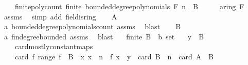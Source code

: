 \begin{isabellebody}
\ \ \ \ finite{\isacharunderscore}{\kern0pt}poly{\isacharunderscore}{\kern0pt}count{\isacharcolon}{\kern0pt}\ {\isachardoublequoteopen}finite\ {\isacharparenleft}{\kern0pt}bounded{\isacharunderscore}{\kern0pt}degree{\isacharunderscore}{\kern0pt}polynomials\ F\ n{\isacharparenright}{\kern0pt}{\isachardoublequoteclose}\ {\isacharparenleft}{\kern0pt}\ {\isacharquery}{\kern0pt}B{\isacharparenright}{\kern0pt}\isanewline
%
\isadelimproof
%
\endisadelimproof
%
\isatagproof
{}\isamarkupfalse%
\ {\isacharminus}{\kern0pt}\isanewline
\ \ \isamarkupfalse%
\ a{\isacharcolon}{\kern0pt}{\isachardoublequoteopen}ring\ F{\isachardoublequoteclose}\ \isamarkupfalse%
\ assms{\isacharparenleft}{\kern0pt}{}{\isacharparenright}{\kern0pt}\ \isamarkupfalse%
\ {\isacharparenleft}{\kern0pt}simp\ add{\isacharcolon}{\kern0pt}\ field{\isachardot}{\kern0pt}is{\isacharunderscore}{\kern0pt}ring{\isacharparenright}{\kern0pt}\isanewline
\ \ \isamarkupfalse%
\ {\isacharquery}{\kern0pt}A\ \isamarkupfalse%
\ a\ bounded{\isacharunderscore}{\kern0pt}degree{\isacharunderscore}{\kern0pt}polynomials{\isacharunderscore}{\kern0pt}count\ assms\ \isamarkupfalse%
\ blast\isanewline
\ \ \isamarkupfalse%
\ {\isacharquery}{\kern0pt}B\ \isamarkupfalse%
\ a\ fin{\isacharunderscore}{\kern0pt}degree{\isacharunderscore}{\kern0pt}bounded\ assms\ \isamarkupfalse%
\ blast\isanewline
{}\isamarkupfalse%
%
\endisatagproof
{\isafoldproof}%
%
\isadelimproof
\isanewline
%
\endisadelimproof
\isanewline
{}\isamarkupfalse%
\isanewline
\ \ \ {\isachardoublequoteopen}finite\ {\isacharparenleft}{\kern0pt}B\ {\isacharcolon}{\kern0pt}{\isacharcolon}{\kern0pt}\ {\isacharprime}{\kern0pt}b\ set{\isacharparenright}{\kern0pt}{\isachardoublequoteclose}\isanewline
\ \ \ {\isachardoublequoteopen}y\ {\isasymin}\ B{\isachardoublequoteclose}\isanewline
\ \ \ \isanewline
\ \ \ \ card{\isacharunderscore}{\kern0pt}mostly{\isacharunderscore}{\kern0pt}constant{\isacharunderscore}{\kern0pt}maps{\isacharcolon}{\kern0pt}\ \isanewline
\ \ \ \ {\isachardoublequoteopen}card\ {\isacharbraceleft}{\kern0pt}f{\isachardot}{\kern0pt}\ range\ f\ {\isasymsubseteq}\ B\ {\isasymand}\ {\isacharparenleft}{\kern0pt}{\isasymforall}x{\isachardot}{\kern0pt}\ x\ {\isasymge}\ n\ {\isasymlongrightarrow}\ f\ x\ {\isacharequal}{\kern0pt}\ y{\isacharparenright}{\kern0pt}{\isacharbraceright}{\kern0pt}\ {\isacharequal}{\kern0pt}\ card\ B\ {\isacharcircum}{\kern0pt}\ n{\isachardoublequoteclose}\ {\isacharparenleft}{\kern0pt}\ {\isachardoublequoteopen}card\ {\isacharquery}{\kern0pt}A\ {\isacharequal}{\kern0pt}\ {\isacharquery}{\kern0pt}B{\isachardoublequoteclose}{\isacharparenright}{\kern0pt}\ \isanewline

\end{isabellebody}
